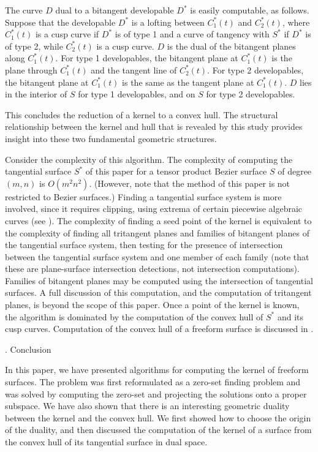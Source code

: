 \documentclass[twoside]{article}
\newcounter{sectionc}\newcounter{subsectionc}\newcounter{subsubsectionc}
\renewcommand{\section}[1] {\vspace{12pt}\addtocounter{sectionc}{1} 
\setcounter{subsectionc}{0}\setcounter{subsubsectionc}{0}\noindent 
	{\tenbf\thesectionc. #1}\par\vspace{5pt}}
\begin{document}
The curve $D$ dual to a bitangent developable $D^*$ is easily
computable, as follows.
Suppose that the developable $D^*$ is a lofting between $C^*_1(t)$ and $C^*_2(t)$,
where $C^*_1(t)$ is a cusp curve if $D^*$ is of type 1 and
a curve of tangency with $S^*$ if $D^*$ is of type 2,
while $C^*_2(t)$ is a cusp curve.
$D$ is the dual of the bitangent planes along $C^*_1(t)$.
For type 1 developables, the bitangent plane at $C^*_1(t)$ is the plane through
$C^*_1(t)$ and the tangent line of $C^*_2(t)$.
For type 2 developables, the bitangent plane at $C^*_1(t)$ is the same as the tangent plane
at $C^*_1(t)$.
$D$ lies in the interior of $S$ for type 1 developables,
and on $S$ for type 2 developables.

This concludes the reduction of a kernel to a convex hull.
The structural relationship between the kernel and hull that is revealed
by this study provides insight into these two fundamental geometric structures.

Consider the complexity of this algorithm.
The complexity of computing the tangential surface $S^*$ of this paper
for a tensor product Bezier surface $S$ of degree $(m,n)$ is $O(m^2 n^2)$.
(However, note that the method of this paper is not restricted to 
Bezier surfaces.)
Finding a tangential surface system is more involved,
since it requires clipping, using extrema
of certain piecewise algebraic curves (see \cite{8}).
The complexity of finding a seed point of the kernel is
equivalent to the complexity of finding all tritangent planes and 
families of bitangent planes of the tangential surface system, then
testing for the presence of intersection between the tangential surface system 
and one member of each family (note that these are plane-surface
intersection detections, not intersection computations).
Families of bitangent planes
may be computed using the intersection of tangential surfaces.
A full discussion of this computation, and the computation of tritangent planes,
is beyond the scope of this paper.
Once a point of the kernel is known,
the algorithm is dominated by the computation of the convex hull
of $S^*$ and its cusp curves.
Computation of the convex hull of a freeform surface is discussed in \cite{3}.

\section{Conclusion}
\label{sec-conclusion}
\noindent
In this paper, we have presented algorithms for computing
the kernel of freeform surfaces.
The problem was first reformulated as a zero-set finding problem
and was solved by computing the zero-set and
projecting the solutions onto a proper subspace.
We have also shown that there is an interesting geometric duality
between the kernel and the convex hull.
We first showed how to choose the origin of the duality, 
and then discussed the computation of the kernel of a surface
from the convex hull of its tangential surface in dual space.
\end{document}

